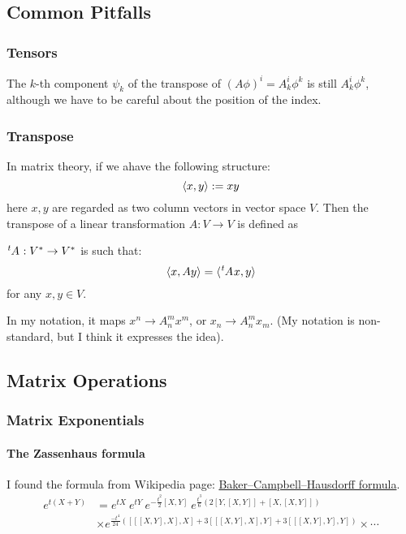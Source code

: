 \subsection{Common Pitfalls}
\label{sec:Common Pitfalls}
    \subsubsection{Tensors}
    \label{sec:Tensors}
    
    The $k$-th component $\psi_k$ of the transpose of $(A\phi)^i = A^i_k
    \phi^k$ is still $A^i_k \phi^k$, although we have to be careful about
    the position of the index.

    \subsubsection{Transpose}
    \label{sec:Transpose}
    
    In matrix theory, if we ahave the following structure:
    $$\braket{x,y} := x y$$
    here $x,y$ are regarded as two column vectors in vector space $V$.
    Then the transpose of a linear transformation $A:V\to V$ is defined
    as
    \begin{defi}[Transpose]
        $\tensor[^t]{A}{}:V^* \to V^*$ is such that:
        \begin{equation}
            \braket{x,Ay} = \braket{\tensor[^t]{A}{}x,y}
        \end{equation}
        for any $x,y\in V$.
    \end{defi}

    In my notation, it maps $x^n\to A^m_n x^m$, or $x_n\to A^m_n x_m$.
    (My notation is non-standard, but I think it expresses the idea).


\subsection{Matrix Operations}
    \subsubsection{Matrix Exponentials}
    \label{sec:Matrix-Exponentials}
    \paragraph{The Zassenhaus formula}
    I found the formula from Wikipedia page:
    \href{https://en.wikipedia.org/wiki/Baker%E2%80%93Campbell%E2%80%93Hausdorff_formula}{Baker–Campbell–Hausdorff formula}.
    \begin{align}
        e^{t(X+Y)} &= e^{tX}~ e^{tY} ~e^{-\frac{t^2}{2} [X,Y]} ~
        e^{\frac{t^3}{6}(2[Y,[X,Y]]+ [X,[X,Y]] )} \nonumber\\
        & \times
          e^{\frac{-t^4}{24}([[[X,Y],X],X] + 3[[[X,Y],X],Y] + 3[[[X,Y],Y],Y]) }
        \times\cdots
    \end{align}

